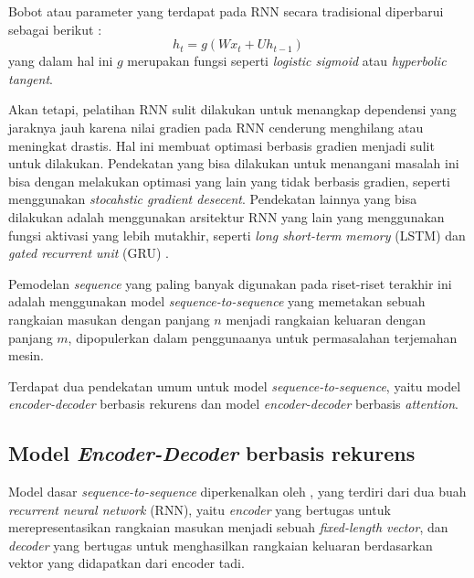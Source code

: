 Bobot atau parameter yang terdapat pada RNN secara tradisional diperbarui sebagai berikut \parencite{Chung2014}:
\[
    h_{t} = g(Wx_{t}+Uh_{t-1})
\]
yang dalam hal ini \(g\) merupakan fungsi seperti \textit{logistic sigmoid} atau \textit{hyperbolic tangent}.
\bigskip

Akan tetapi, pelatihan RNN sulit dilakukan untuk menangkap dependensi yang jaraknya jauh karena nilai gradien pada RNN cenderung menghilang atau meningkat drastis. Hal ini membuat optimasi berbasis gradien menjadi sulit untuk dilakukan. Pendekatan yang bisa dilakukan untuk menangani masalah ini bisa dengan melakukan optimasi yang lain yang tidak berbasis gradien, seperti menggunakan \textit{stocahstic gradient desecent}. Pendekatan lainnya yang bisa dilakukan adalah menggunakan arsitektur RNN yang lain yang menggunakan fungsi aktivasi yang lebih mutakhir, seperti \textit{long short-term memory} (LSTM) \parencite{Hochreiter1997} dan \textit{gated recurrent unit} (GRU) \parencite{Cho2014a}.
\bigskip

Pemodelan \textit{sequence} yang paling banyak digunakan pada riset-riset terakhir ini adalah menggunakan model \textit{sequence-to-sequence} yang memetakan sebuah rangkaian masukan dengan panjang \(n\) menjadi rangkaian keluaran dengan panjang \(m\), dipopulerkan dalam penggunaanya untuk permasalahan terjemahan mesin.
\bigskip

Terdapat dua pendekatan umum untuk model \textit{sequence-to-sequence}, yaitu model \textit{encoder-decoder} berbasis rekurens dan model \textit{encoder-decoder} berbasis \textit{attention}.


\subsection{Model \textit{Encoder-Decoder} berbasis rekurens}

Model dasar \textit{sequence-to-sequence} diperkenalkan oleh \textcite{Cho2014b}, yang terdiri dari dua buah \textit{recurrent neural network} (RNN), yaitu \textit{encoder} yang bertugas untuk merepresentasikan rangkaian masukan menjadi sebuah \textit{fixed-length vector}, dan \textit{decoder} yang bertugas untuk menghasilkan rangkaian keluaran berdasarkan vektor yang didapatkan dari encoder tadi.

